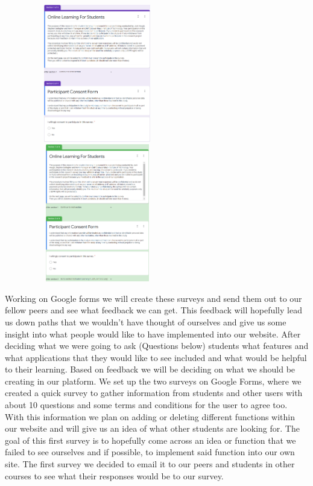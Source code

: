 \begin{figure}
    \centering
    \includegraphics[width=6cm,height = 6cm]{images/22.png}
    \includegraphics[width=6cm,height = 6cm]{images/23.png}
    \caption{ }
    \label{fig:my_label}
\end{figure}
Working on Google forms we will create these surveys and send them out to our fellow peers and see what feedback we can get. This feedback will hopefully lead us down paths that we wouldn’t have thought of ourselves and give us some insight into what people would like to have implemented into our website.
After deciding what we were going to ask (Questions below) students what features and what applications that they would like to see included and what would be helpful to their learning. Based on feedback we will be deciding on what we should be creating in our platform. \hfill \break
\hfill \break
We set up the two surveys on Google Forms, where we created a quick survey to gather information from students and other users with about 10 questions and some terms and conditions for the user to agree too. With this information we plan on adding or deleting different functions within our website and will give us an idea of what other students are looking for. The goal of this first survey is to hopefully come across an idea or function that we failed to see ourselves and if possible, to implement said function into our own site. The first survey we decided to email it to our peers and students in other courses to see what their responses would be to our survey.  \hfill \break




